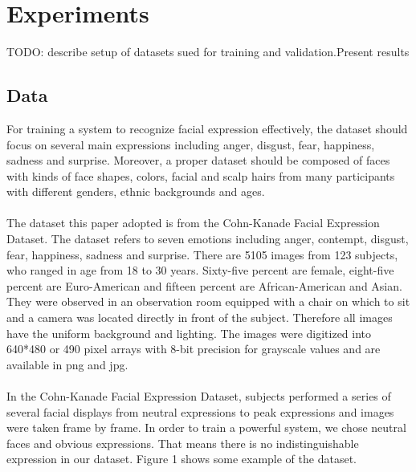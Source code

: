 \section{Experiments}
\nocite{Kanade2000CK+}\nocite{Lucey2010CK+}

TODO: describe setup of datasets sued for training and validation.Present results

\subsection{Data}
For training a system to recognize facial expression effectively, the dataset should focus on several main expressions including anger, disgust, fear, happiness, sadness and surprise. Moreover, a proper dataset should be composed of faces with kinds of face shapes, colors, facial and scalp hairs from many participants with different genders, ethnic backgrounds and ages. 
\\
\\
The dataset this paper adopted is from the Cohn-Kanade Facial Expression Dataset. The dataset refers to seven emotions including anger, contempt, disgust, fear, happiness, sadness and surprise. There are 5105 images from 123 subjects, who ranged in age from 18 to 30 years. Sixty-five percent are female, eight-five percent are Euro-American and fifteen percent are African-American and Asian. They were observed in an observation room equipped with a chair on which to sit and a camera was located directly in front of the subject. Therefore all images have the uniform background and lighting. The images were digitized into 640*480 or 490 pixel arrays with 8-bit precision for grayscale values and are available in png and jpg. 
\\
\\
In the Cohn-Kanade Facial Expression Dataset, subjects performed a series of several facial displays from neutral expressions to peak expressions and images were taken frame by frame. In order to train a powerful system, we chose neutral faces and obvious expressions. That means there is no indistinguishable expression in our dataset. Figure 1 shows some example of the dataset.



